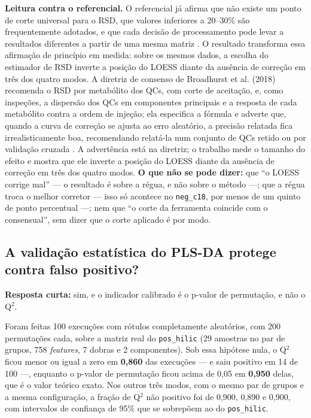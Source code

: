 
\textbf{Leitura contra o referencial.} O referencial já afirma que não existe um ponto de corte universal para o RSD, que valores inferiores a 20--30\% são frequentemente adotados, e que cada decisão de processamento pode levar a resultados diferentes a partir de uma mesma matriz \cite{diguida2016non}. O resultado transforma essa afirmação de princípio em medida: sobre os mesmos dados, a escolha do estimador de RSD inverte a posição do LOESS diante da ausência de correção em três dos quatro modos. A diretriz de consenso de Broadhurst et al. (2018) recomenda o RSD por metabólito dos QCs, com corte de aceitação, e, como inspeções, a dispersão dos QCs em componentes principais e a resposta de cada metabólito contra a ordem de injeção; ela especifica a fórmula e adverte que, quando a curva de correção se ajusta ao erro aleatório, a precisão relatada fica irrealisticamente boa, recomendando relatá-la num conjunto de QCs retido ou por validação cruzada \cite{broadhurst2018guidelines}. A advertência está na diretriz; o trabalho mede o tamanho do efeito e mostra que ele inverte a posição do LOESS diante da ausência de correção em três dos quatro modos. \textbf{O que não se pode dizer:} que ``o LOESS corrige mal'' --- o resultado é sobre a régua, e não sobre o método ---; que a régua troca o melhor corretor --- isso só acontece no \texttt{neg\_\allowbreak{}c18}, por menos de um quinto de ponto percentual ---; nem que ``o corte da ferramenta coincide com o consensual'', sem dizer que o corte aplicado é por modo.


\subsection{A validação estatística do PLS-DA protege contra falso positivo?}\label{sec:5-3-3}

\textbf{Resposta curta:} sim, e o indicador calibrado é o p-valor de permutação, e não o Q$^{2}$.

Foram feitas 100 execuções com rótulos completamente aleatórios, com 200 permutações cada, sobre a matriz real do \texttt{pos\_\allowbreak{}hilic} (29 amostras no par de grupos, 758 \textit{features}, 7 dobras e 2 componentes). Sob essa hipótese nula, o Q$^{2}$ ficou menor ou igual a zero em \textbf{0,860} das execuções --- e saiu positivo em 14 de 100 ---, enquanto o p-valor de permutação ficou acima de 0,05 em \textbf{0,950} delas, que é o valor teórico exato. Nos outros três modos, com o mesmo par de grupos e a mesma configuração, a fração de Q$^{2}$ não positivo foi de 0,900, 0,890 e 0,900, com intervalos de confiança de 95\% que se sobrepõem ao do \texttt{pos\_\allowbreak{}hilic}.

